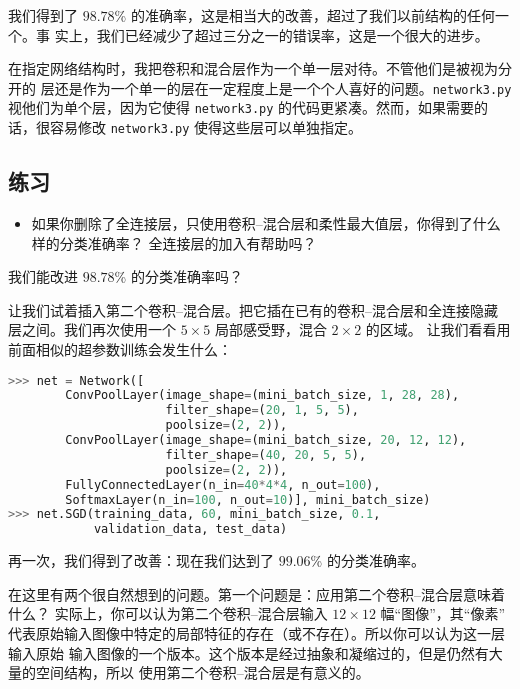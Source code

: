 我们得到了 $98.78$\% 的准确率，这是相当大的改善，超过了我们以前结构的任何一个。事
实上，我们已经减少了超过三分之一的错误率，这是一个很大的进步。

在指定网络结构时，我把卷积和混合层作为一个单一层对待。不管他们是被视为分开的
层还是作为一个单一的层在一定程度上是一个个人喜好的问题。\lstinline!network3.py!
视他们为单个层，因为它使得 \lstinline!network3.py! 的代码更紧凑。然而，如果需要的
话，很容易修改 \lstinline!network3.py! 使得这些层可以单独指定。

\subsection*{练习}

\begin{itemize}
\item 如果你删除了全连接层，只使用卷积--混合层和柔性最大值层，你得到了什么样的分类准确率？
全连接层的加入有帮助吗？
\end{itemize}

我们能改进 $98.78$\% 的分类准确率吗？

让我们试着插入第二个卷积--混合层。把它插在已有的卷积--混合层和全连接隐藏
层之间。我们再次使用一个 $5 \times 5$ 局部感受野，混合 $2 \times 2$ 的区域。
让我们看看用前面相似的超参数训练会发生什么：
\begin{lstlisting}[language=Python]
>>> net = Network([
        ConvPoolLayer(image_shape=(mini_batch_size, 1, 28, 28), 
                      filter_shape=(20, 1, 5, 5), 
                      poolsize=(2, 2)),
        ConvPoolLayer(image_shape=(mini_batch_size, 20, 12, 12), 
                      filter_shape=(40, 20, 5, 5), 
                      poolsize=(2, 2)),
        FullyConnectedLayer(n_in=40*4*4, n_out=100),
        SoftmaxLayer(n_in=100, n_out=10)], mini_batch_size)
>>> net.SGD(training_data, 60, mini_batch_size, 0.1, 
            validation_data, test_data)        
\end{lstlisting}

再一次，我们得到了改善：现在我们达到了 $99.06$\% 的分类准确率。

在这里有两个很自然想到的问题。第一个问题是：应用第二个卷积--混合层意味着什么？
实际上，你可以认为第二个卷积--混合层输入 $12 \times 12$ 幅“图像”，其“像素”
代表原始输入图像中特定的局部特征的存在（或不存在）。所以你可以认为这一层输入原始
输入图像的一个版本。这个版本是经过抽象和凝缩过的，但是仍然有大量的空间结构，所以
使用第二个卷积--混合层是有意义的。

